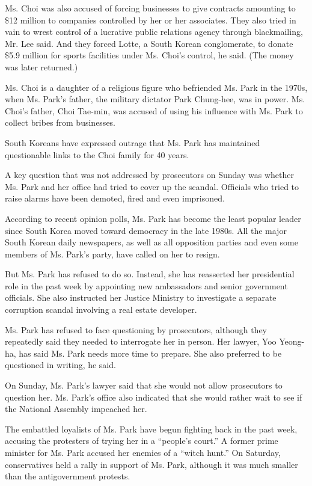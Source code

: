 Ms. Choi was also accused of forcing businesses to give contracts
amounting to \$12 million to companies controlled by her or her
associates. They also tried in vain to wrest control of a lucrative
public relations agency through blackmailing, Mr. Lee said. And they
forced Lotte, a South Korean conglomerate, to donate \$5.9 million for
sports facilities under Ms. Choi's control, he said. (The money was
later returned.)

Ms. Choi is a daughter of a religious figure who befriended Ms. Park in
the 1970s, when Ms. Park's father, the military dictator Park Chung-hee,
was in power. Ms. Choi's father, Choi Tae-min, was accused of using his
influence with Ms. Park to collect bribes from businesses.

South Koreans have expressed outrage that Ms. Park has maintained
questionable links to the Choi family for 40 years.

A key question that was not addressed by prosecutors on Sunday was
whether Ms. Park and her office had tried to cover up the scandal.
Officials who tried to raise alarms have been demoted, fired and even
imprisoned.

According to recent opinion polls, Ms. Park has become the least popular
leader since South Korea moved toward democracy in the late 1980s. All
the major South Korean daily newspapers, as well as all opposition
parties and even some members of Ms. Park's party, have called on her to
resign.

But Ms. Park has refused to do so. Instead, she has reasserted her
presidential role in the past week by appointing new ambassadors and
senior government officials. She also instructed her Justice Ministry to
investigate a separate corruption scandal involving a real estate
developer.

Ms. Park has refused to face questioning by prosecutors, although they
repeatedly said they needed to interrogate her in person. Her lawyer,
Yoo Yeong-ha, has said Ms. Park needs more time to prepare. She also
preferred to be questioned in writing, he said.

On Sunday, Ms. Park's lawyer said that she would not allow prosecutors
to question her. Ms. Park's office also indicated that she would rather
wait to see if the National Assembly impeached her.

The embattled loyalists of Ms. Park have begun fighting back in the past
week, accusing the protesters of trying her in a ``people's court.'' A
former prime minister for Ms. Park accused her enemies of a ``witch
hunt.'' On Saturday, conservatives held a rally in support of Ms. Park,
although it was much smaller than the antigovernment protests.

